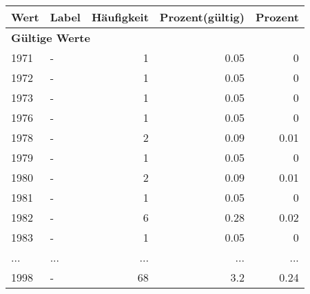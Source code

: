      \begin{longtable}{lXrrr}
     \toprule
     \textbf{Wert} & \textbf{Label} & \textbf{Häufigkeit} & \textbf{Prozent(gültig)} & \textbf{Prozent} \\
     \endhead
     \midrule
     \multicolumn{5}{l}{\textbf{Gültige Werte}}\\
        1971 & \multicolumn{1}{X}{-} & %
          \num{1} &
          \num[round-mode=places,round-precision=2]{0,05} &
          \num[round-mode=places,round-precision=2]{0} \\
        1972 & \multicolumn{1}{X}{-} & %
          \num{1} &
          \num[round-mode=places,round-precision=2]{0,05} &
          \num[round-mode=places,round-precision=2]{0} \\
        1973 & \multicolumn{1}{X}{-} & %
          \num{1} &
          \num[round-mode=places,round-precision=2]{0,05} &
          \num[round-mode=places,round-precision=2]{0} \\
        1976 & \multicolumn{1}{X}{-} & %
          \num{1} &
          \num[round-mode=places,round-precision=2]{0,05} &
          \num[round-mode=places,round-precision=2]{0} \\
        1978 & \multicolumn{1}{X}{-} & %
          \num{2} &
          \num[round-mode=places,round-precision=2]{0,09} &
          \num[round-mode=places,round-precision=2]{0,01} \\
        1979 & \multicolumn{1}{X}{-} & %
          \num{1} &
          \num[round-mode=places,round-precision=2]{0,05} &
          \num[round-mode=places,round-precision=2]{0} \\
        1980 & \multicolumn{1}{X}{-} & %
          \num{2} &
          \num[round-mode=places,round-precision=2]{0,09} &
          \num[round-mode=places,round-precision=2]{0,01} \\
        1981 & \multicolumn{1}{X}{-} & %
          \num{1} &
          \num[round-mode=places,round-precision=2]{0,05} &
          \num[round-mode=places,round-precision=2]{0} \\
        1982 & \multicolumn{1}{X}{-} & %
          \num{6} &
          \num[round-mode=places,round-precision=2]{0,28} &
          \num[round-mode=places,round-precision=2]{0,02} \\
        1983 & \multicolumn{1}{X}{-} & %
          \num{1} &
          \num[round-mode=places,round-precision=2]{0,05} &
          \num[round-mode=places,round-precision=2]{0} \\
       ... & ... & ... & ... & ... \\
        1998 & \multicolumn{1}{X}{-} & %
          \num{68} &
          \num[round-mode=places,round-precision=2]{3,2} &
          \num[round-mode=places,round-precision=2]{0,24} \\


\end{longtable}
